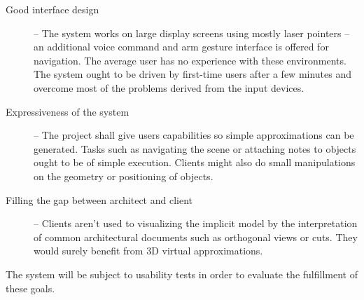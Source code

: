 
\begin{description}
	\item[Good interface design] --
		The system works on large display screens using mostly laser pointers
		-- an additional voice command and arm gesture interface is offered for navigation.
		The average user has no experience with these environments.
		The system ought to be driven by first-time users after a few minutes and overcome most of the
		problems derived from the input devices.
		
	\item[Expressiveness of the system] --
		The project shall give users capabilities so simple approximations can be generated.
		Tasks such as navigating the scene or attaching notes to objects ought to be of simple execution.
		Clients might also do small manipulations on the geometry or positioning of objects.
	
	\item[Filling the gap between architect and client] --
		Clients aren't used to visualizing the implicit model by the interpretation of 
		common architectural documents such as orthogonal views or cuts.
		They would surely benefit from 3D virtual approximations.
\end{description}

The system will be subject to usability tests in order to evaluate the fulfillment of these goals.

